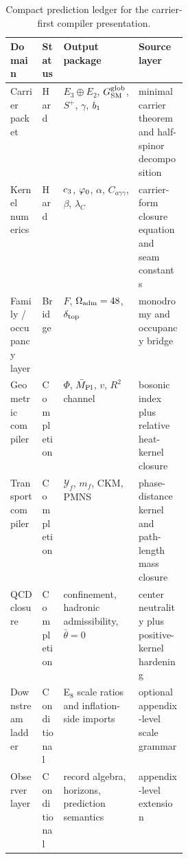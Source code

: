 \begin{table}[t]
\centering
\small
\begin{tabularx}{\linewidth}{@{}>{\raggedright\arraybackslash}p{0.18\linewidth}>{\raggedright\arraybackslash}p{0.12\linewidth}YY@{}}
\toprule
Domain & Status & Output package & Source layer \\
\midrule
Carrier packet & Hard & $E_3\oplus E_2$, $G_{\mathrm{SM}}^{\mathrm{glob}}$, $S^+$, $\gamma$, $b_1$ & minimal carrier theorem and half-spinor decomposition \\
Kernel numerics & Hard & $c_3$, $\varphi_0$, $\alpha$, $C_{a\gamma\gamma}$, $\beta$, $\lambda_C$ & carrier-form closure equation and seam constants \\
Family / occupancy layer & Bridge & $F$, $\Omega_{\mathrm{adm}}=48$, $\delta_{\mathrm{top}}$ & monodromy and occupancy bridge \\
Geometric compiler & Completion & $\Phi$, $\bar M_{\mathrm{Pl}}$, $v$, $R^2$ channel & bosonic index plus relative heat-kernel closure \\
Transport compiler & Completion & $\mathcal Y_f$, $m_f$, CKM, PMNS & phase-distance kernel and path-length mass closure \\
QCD closure & Completion & confinement, hadronic admissibility, $\bar\theta=0$ & center neutrality plus positive-kernel hardening \\
Downstream ladder & Conditional & E$_8$ scale ratios and inflation-side imports & optional appendix-level scale grammar \\
Observer layer & Conditional & record algebra, horizons, prediction semantics & appendix-level extension \\
\bottomrule
\end{tabularx}
\caption{Compact prediction ledger for the carrier-first compiler presentation.}
\label{tab:prediction-ledger}
\end{table}

